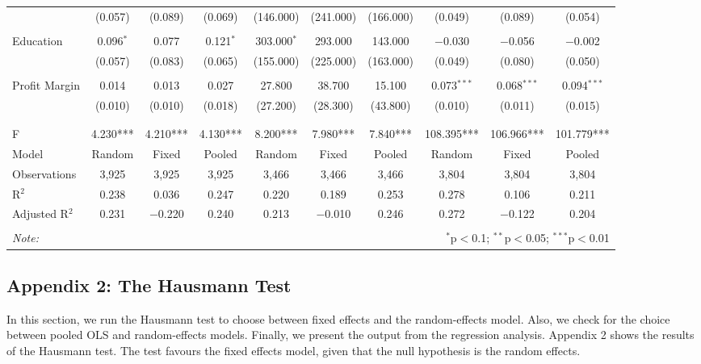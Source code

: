\documentclass[a4paper,nobind]{templates/ociamthesis}
\begin{document}
\begin{landscape}
\begin{table}[!htbp]
\begin{tabular}{@{\extracolsep{5pt}}lccccccccc}
  & (0.057) & (0.089) & (0.069) & (146.000) & (241.000) & (166.000) & (0.049) & (0.089) & (0.054) \\ 
  & & & & & & & & & \\ 
 Education & 0.096$^{*}$ & 0.077 & 0.121$^{*}$ & 303.000$^{*}$ & 293.000 & 143.000 & $-$0.030 & $-$0.056 & $-$0.002 \\ 
  & (0.057) & (0.083) & (0.065) & (155.000) & (225.000) & (163.000) & (0.049) & (0.080) & (0.050) \\ 
  & & & & & & & & & \\ 
 Profit Margin & 0.014 & 0.013 & 0.027 & 27.800 & 38.700 & 15.100 & 0.073$^{***}$ & 0.068$^{***}$ & 0.094$^{***}$ \\ 
  & (0.010) & (0.010) & (0.018) & (27.200) & (28.300) & (43.800) & (0.010) & (0.011) & (0.015) \\ 
  & & & & & & & & & \\ 
\hline \\[-1.8ex] 
F & 4.230*** & 4.210*** & 4.130*** & 8.200*** & 7.980*** & 7.840*** & 108.395*** & 106.966*** & 101.779*** \\ 
Model & Random & Fixed & Pooled & Random & Fixed & Pooled & Random & Fixed & Pooled \\ 
Observations & 3,925 & 3,925 & 3,925 & 3,466 & 3,466 & 3,466 & 3,804 & 3,804 & 3,804 \\ 
R$^{2}$ & 0.238 & 0.036 & 0.247 & 0.220 & 0.189 & 0.253 & 0.278 & 0.106 & 0.211 \\ 
Adjusted R$^{2}$ & 0.231 & $-$0.220 & 0.240 & 0.213 & $-$0.010 & 0.246 & 0.272 & $-$0.122 & 0.204 \\ 
\hline 
\hline \\[-1.8ex] 
\textit{Note:}  & \multicolumn{9}{r}{$^{*}$p$<$0.1; $^{**}$p$<$0.05; $^{***}$p$<$0.01} \\ 
\end{tabular} 
\end{table}

\end{landscape}
\newpage

\hypertarget{appendix-2-the-hausmann-test}{%
\subsection{Appendix 2: The Hausmann Test}\label{appendix-2-the-hausmann-test}}

In this section, we run the Hausmann test to choose between fixed effects and the random-effects model. Also, we check for the choice between pooled OLS and random-effects models. Finally, we present the output from the regression analysis. Appendix 2 shows the results of the Hausmann test. The test favours the fixed effects model, given that the null hypothesis is the random effects.
\end{document}
